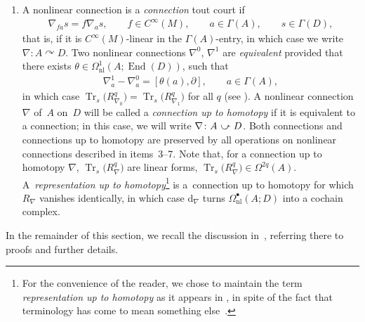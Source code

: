 \documentclass[11pt]{article}
\numberwithin{equation}{section}
\newcommand{\acts}{\curvearrowright}
\newcommand{\homo}{ \ \raisebox{\depth}{\scalebox{1}[-1]{$\curvearrowright$}} \ }
\newcommand{\bd}{\partial}
\newcommand{\dd}{\mathrm{d}}
\newcommand{\8}{\infty}
\begin{document}
\begin{enumerate}
\begin{gather*}
 \phi_*(T_xN) + \varrho_A(A_{\phi(x)}) = T_{\phi(x)}M, \qquad x \in N,
\end{gather*}then there is a \emph{pullback Lie algebroid} $\phi^!(A):=TN \times_{TM}A$ on $N$, and an induced \emph{pullback morphism} of Lie algebroids $\big(\widetilde{\phi},\phi\big)\colon \phi^!(A) \to A$. In this case, we will write simply~$\phi^!\nabla$ and~$\phi^*$ instead of $\big(\widetilde{\phi},\phi\big)^!\nabla$ and $\big(\widetilde{\phi},\phi\big)^*$.
\item A nonlinear connection is a \emph{connection} tout court if
\begin{gather*}
 \nabla_{fa}s = f\nabla_as, \qquad f \in C^{\8}(M), \qquad a \in \Gamma(A), \qquad s \in \Gamma(D),
\end{gather*}that is, if it is $C^{\8}(M)$-linear in the $\Gamma(A)$-entry, in which case we write $\nabla\colon A \acts D$. Two nonlinear connections $\nabla^0$, $\nabla^1$ are \emph{equivalent} provided that there exists $\theta \in \Omega_{\mathrm{nl}}^1(A;\operatorname{End}(D))$, such that
\begin{gather*}
 \nabla^1_a -\nabla^0_a = [\theta(a),\bd], \qquad a \in \Gamma(A),
\end{gather*}in which case $\operatorname{Tr}_s\big(R_{\nabla_0}^q\big)=\operatorname{Tr}_s\big(R_{\nabla_1}^q\big)$ for all $q$ (see \cite{CrFer_Char}). A nonlinear connection~$\nabla$ of~$A$ on~$D$ will be called a \emph{connection up to homotopy} if it is equivalent to a connection; in this case, we will write $\nabla\colon A \homo D$. Both connections and connections up to homotopy are preserved by all operations on nonlinear connections described in items~3--7. Note that, for a connection up to homotopy $\nabla$, $\operatorname{Tr}_s\big(R_{\nabla}^q\big)$ are linear forms, $\operatorname{Tr}_s\big(R_{\nabla}^q\big) \in \Omega^{2q}(A)$. A~\emph{representation up to homotopy}\footnote{For the convenience of the reader, we chose to maintain the term \emph{representation up to homotopy} as it appears in \cite{CrainicNL,CrFer_Char}, in spite of the fact that terminology has come to mean something else~\cite{AbadCrainic}.} is a~connection up to homotopy for which $R_{\nabla}$ vanishes identically, in which case $\dd_{\nabla}$ turns $\Omega^{\bullet}_{\mathrm{nl}}(A;D)$ into a cochain complex.
\end{enumerate}
In the remainder of this section, we recall the discussion in~\cite{CrFer_Char}, referring there to proofs and further details.
\end{document}
